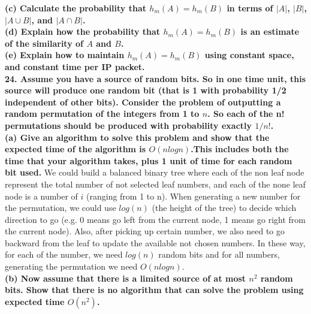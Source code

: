 \documentclass{article}
\begin{document}
\textbf{(c) Calculate the probability that $h_m(A) = h_m(B)$ in terms of $|A|$, $|B|$, $|A\cup B|$, and $|A\cap B|$.}\\ \newline
\textbf{(d) Explain how the probability that $h_m(A) = h_m(B)$ is an estimate of the similarity of $A$ and $B$.} \\ \newline
\textbf{(e) Explain how to maintain $h_m(A) = h_m(B)$ using constant space, and constant time per IP packet.} \\ \newline
\textbf{24. Assume you have a source of random bits. So in one time unit, this source will produce one random bit (that is 1 with probability 1/2 independent of other bits). Consider the problem of outputting a random permutation of the integers from 1 to $n$. So each of the n! permutations should be produced with probability exactly $1/n!$.} \\ \newline
\textbf{(a) Give an algorithm to solve this problem and show that the expected time of the algorithm is $O(nlogn)$.This includes both the time that your algorithm takes, plus 1 unit of time for each random bit used.} \newline
We could build a balanced binary tree where each of the non leaf node represent the total number of not selected leaf numbers, and each of the none leaf node is a number of $i$ (ranging from 1 to n). When generating a new number for the permutation, we could use $log(n)$ (the height of the tree) to decide which direction to go (e.g. 0 means go left from the current node, 1 means go right from the current node). Also, after picking up certain number, we also need to go backward from the leaf to update the available not chosen numbers. In these way, for each of the number, we need $log(n)$ random bits and for all numbers, generating the permutation we need $O(nlogn)$.
\\ \newline
\textbf{(b) Now assume that there is a limited source of at most $n^2$ random bits. Show that there is no algorithm that can solve the problem using expected time $O(n^2)$.}
\end{document}

